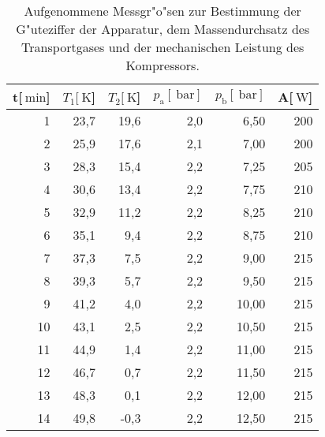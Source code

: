 
\begin{table}[!h]
\begin{center}
\begin{tabular}{|r|r|r|r|r|r|}
\hline
t[$\SI{}{\minute}$] & $T_\mathrm{1}[\SI{}{\kelvin}$] & $T_\mathrm{2}[\SI{}{\kelvin}$] & $p_\mathrm{a}[\SI{}{\bar}]$ & $p_\mathrm{b}[\SI{}{\bar}]$ & A[$\SI{}{\watt}$]\\
\hline
\hline

 1 &	23,7 &	19,6 &	2,0 &	 6,50 &	200\\
 2 &	25,9 &	17,6 &	2,1 &	 7,00 &	200\\
 3 &	28,3 &	15,4 &	2,2 &	 7,25 &	205\\
 4 &	30,6 &	13,4 &	2,2 &	 7,75 &	210\\
 5 &	32,9 &	11,2 &	2,2 &	 8,25 &	210\\
 6 &	35,1 &	 9,4 &	2,2 &	 8,75 &	210\\
 7 &	37,3 &	 7,5 &	2,2 &	 9,00 &	215\\
 8 &	39,3 &	 5,7 &	2,2 &	 9,50 &	215\\
 9 &	41,2 &	 4,0 &	2,2 &	10,00 &	215\\
10 &	43,1 &	 2,5 &	2,2 &	10,50 &	215\\
11 &	44,9 &	 1,4 &	2,2 &	11,00 &	215\\
12 &	46,7 &	 0,7 &	2,2 &	11,50 &	215\\
13 &	48,3 &	 0,1 &	2,2 &	12,00 &	215\\
14 &	49,8 &	-0,3 &	2,2 &	12,50 &	215\\

\hline
\end{tabular}
\caption[]{Aufgenommene Messgr"o"sen zur Bestimmung der G"uteziffer der Apparatur, dem Massendurchsatz des Transportgases und der mechanischen Leistung des Kompressors.}
\label{daten}
\end{center}
\end{table}
